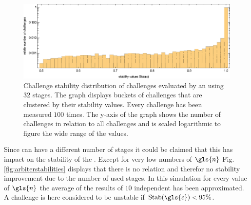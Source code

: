 \begin{figure}[ht]
\includegraphics[width=1.00\textwidth]{images/arbiter-stability-distribution-simulation.eps}
\caption[Challenge stability distribution of an \apuf]{Challenge stability distribution of challenges evaluated by an \apuf using $32$ stages. 
The graph displays buckets of challenges that are clustered by their stability values.
Every challenge has been measured $100$ times. The y-axis of the graph shows the number of challenges in relation to all challenges and is scaled logarithmic to figure the wide range of the values.}  %
\label{fig:arbiterstabilitydistribution}
\end{figure}

Since \apufs can have a different number of stages it could be claimed that this has impact on the stability of the \puf.
Except for very low numbers of $\gls{n}$ Fig. \ref{fig:arbiterstabilities} displays that there is no relation and therefor no stability improvement due to the number of used stages. %
In this simulation for every value of $\gls{n}$ the average of the results of $10$ independent \apufs has been approximated.
A challenge is here considered to be unstable if $\Stab(\gls{c}) < 95 \%$.

